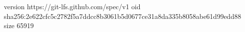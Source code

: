 version https://git-lfs.github.com/spec/v1
oid sha256:2e622cfc5c2782f5a7ddcc8b3061b5d0677ce31a8da335b8058abe61d99edd88
size 65919
